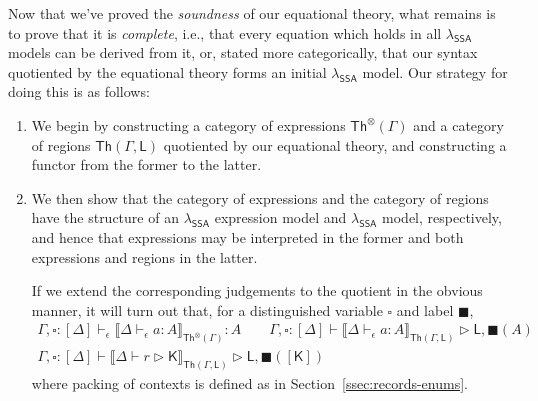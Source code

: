 \documentclass[acmsmall,screen,review]{acmart}
\newcommand{\ms}[1]{\ensuremath{\mathsf{#1}}}
\newcommand{\hasty}[4]{#1 \vdash_{#2} #3: {#4}}
\newcommand{\haslb}[3]{#1 \vdash #2 \rhd #3}
\newcommand{\dnt}[1]{\llbracket{#1}\rrbracket}
\newcommand{\invar}{\square}
\newcommand{\outlb}{\blacksquare}
\newcommand{\isotopessa}{\(\lambda_{\ms{SSA}}\)}
\begin{document}
Now that we've proved the \emph{soundness} of our equational theory, what remains is to prove that
it is \emph{complete}, i.e., that every equation which holds in all \isotopessa{} models can be
derived from it, or, stated more categorically, that our syntax quotiented by the equational theory
forms an initial \isotopessa{} model.
%
Our strategy for doing this is as follows:
\begin{enumerate}
  \item We begin by constructing a category of expressions $\ms{Th}^\otimes(\Gamma)$ and a category
  of regions $\ms{Th}(\Gamma, \ms{L})$ quotiented by our equational theory, and constructing a
  functor from the former to the latter.
  \item We then show that the category of expressions and the category of regions have the structure
  of an \isotopessa{} expression model and \isotopessa{} model, respectively, and hence that
  expressions may be interpreted in the former and both expressions and regions in the latter.

  If we extend the corresponding judgements to the quotient in the obvious manner, it will turn out
  that, for a distinguished variable $\invar$ and label $\outlb$,
  \begin{equation}
    \begin{gathered}
      \hasty{\Gamma, \invar : [\Delta]}{\epsilon}
        {\dnt{\hasty{\Delta}{\epsilon}{a}{A}}_{\ms{Th}^\otimes(\Gamma)}}{A}
        \qquad
      \haslb{\Gamma, \invar : [\Delta]}
        {\dnt{\hasty{\Delta}{\epsilon}{a}{A}}_{\ms{Th}(\Gamma, \ms{L})}}{\ms{L}, \outlb(A)}
        \\
      \haslb{\Gamma, \invar : [\Delta]}
        {\dnt{\haslb{\Delta}{r}{\ms{K}}}_{\ms{Th}(\Gamma, \ms{L})}}{\ms{L}, \outlb([\ms{K}])}
    \end{gathered}
  \end{equation}
  where packing of contexts is defined as in Section~\ref{ssec:records-enums}.
  

\end{enumerate}
\end{document}
